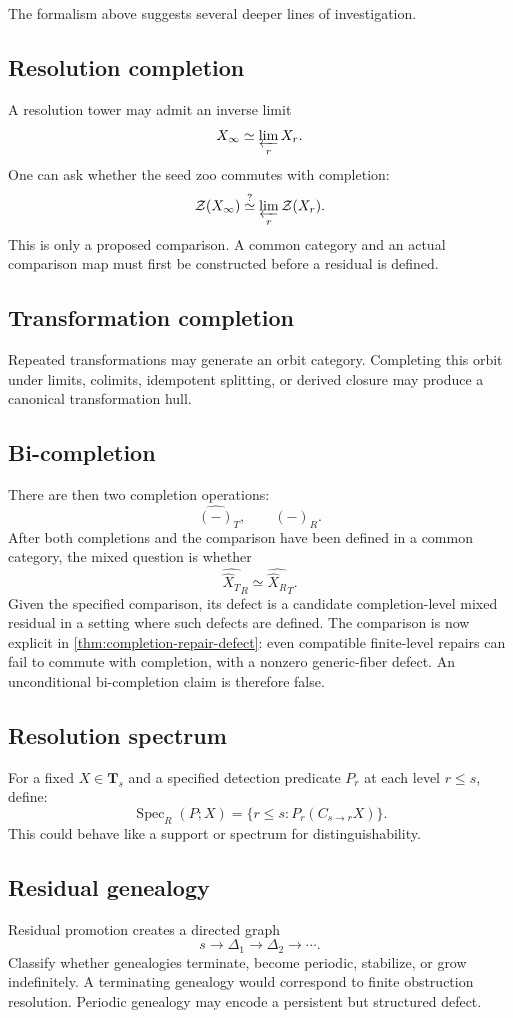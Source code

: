 \documentclass[11pt]{article}
\theoremstyle{definition}
\theoremstyle{remark}
\newcommand{\Tcat}{\mathbf T}
\newcommand{\Zoo}{\mathcal Z}
\begin{document}
The formalism above suggests several deeper lines of investigation.

\subsection{Resolution completion}
A resolution tower may admit an inverse limit
\[
X_\infty\simeq\varprojlim_r X_r.
\]
One can ask whether the seed zoo commutes with completion:
\[
\Zoo(X_\infty)
\stackrel{?}{\simeq}
\varprojlim_r\Zoo(X_r).
\]
This is only a proposed comparison. A common category and an actual comparison map must first be constructed before a residual is defined.

\subsection{Transformation completion}
Repeated transformations may generate an orbit category. Completing this orbit under limits, colimits, idempotent splitting, or derived closure may produce a canonical transformation hull.

\subsection{Bi-completion}
There are then two completion operations:
\[
\widehat{(-)}_T,
\qquad
\widehat{(-)}_R.
\]
After both completions and the comparison have been defined in a common category, the mixed question is whether
\[
\widehat{\widehat X_T}_R
\simeq
\widehat{\widehat X_R}_T.
\]
Given the specified comparison, its defect is a candidate completion-level mixed residual in a setting where such defects are defined. The comparison is now explicit in \cref{thm:completion-repair-defect}: even compatible finite-level repairs can fail to commute with completion, with a nonzero generic-fiber defect. An unconditional bi-completion claim is therefore false.

\subsection{Resolution spectrum}
For a fixed $X\in\Tcat_s$ and a specified detection predicate $P_r$ at each level $r\le s$, define:
\[
\operatorname{Spec}_R(P;X)
=
\{r\le s:P_r(C_{s\to r}X)\}.
\]
This could behave like a support or spectrum for distinguishability.

\subsection{Residual genealogy}
Residual promotion creates a directed graph
\[
s\to\Delta_1\to\Delta_2\to\cdots.
\]
Classify whether genealogies terminate, become periodic, stabilize, or grow indefinitely. A terminating genealogy would correspond to finite obstruction resolution. Periodic genealogy may encode a persistent but structured defect.
\end{document}
